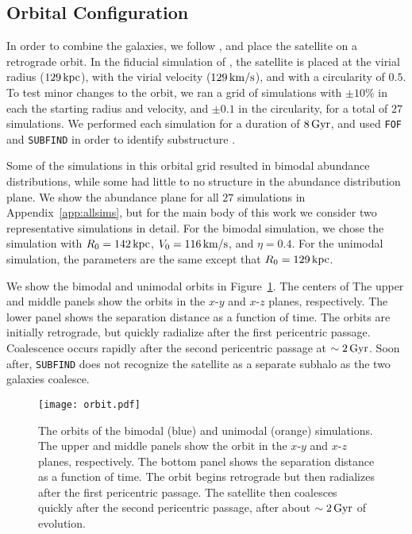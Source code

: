 \subsection{Orbital Configuration}\label{ssec:orbit_setup}
In order to combine the galaxies, we follow \citet{2021ApJ...923...92N}, and place the satellite on a retrograde orbit. In the fiducial simulation of \citet{2021ApJ...923...92N}, the satellite is placed at the virial radius ($129\,\textrm{kpc}$), with the virial velocity ($129\,\textrm{km}/\textrm{s}$), and with a circularity of $0.5$. To test minor changes to the orbit, we ran a grid of simulations with $\pm10\%$ in each the starting radius and velocity, and $\pm0.1$ in the circularity, for a total of $27$ simulations. We performed each simulation for a duration of $8\,\textrm{Gyr}$, and used \texttt{FOF} and \texttt{SUBFIND} in order to identify substructure \citep{2005Natur.435..629S,2009MNRAS.399..497D}.

Some of the simulations in this orbital grid resulted in bimodal abundance distributions, while some had little to no structure in the abundance distribution plane. We show the abundance plane for all $27$ simulations in Appendix~\ref{app:allsims}, but for the main body of this work we consider two representative simulations in detail. For the bimodal simulation, we chose the simulation with $R_0=142\,\textrm{kpc}$, $V_0=116\,\textrm{km}/\textrm{s}$, and $\eta=0.4$. For the unimodal simulation, the parameters are the same except that $R_0=129\,\textrm{kpc}$.

We show the bimodal and unimodal orbits in Figure~\ref{fig:orbit}. The centers of  The upper and middle panels show the orbits in the $x$-$y$ and $x$-$z$ planes, respectively. The lower panel shows the separation distance as a function of time. The orbits are initially retrograde, but quickly radialize after the first pericentric passage. Coalescence occurs rapidly after the second pericentric passage at $\sim2\,\textrm{Gyr}$. Soon after, \texttt{SUBFIND} does not recognize the satellite as a separate subhalo as the two galaxies coalesce.

\begin{figure}
    \centering
    \texttt{[image: orbit.pdf]}
    \caption{The orbits of the bimodal (blue) and unimodal (orange) simulations. The upper and middle panels show the orbit in the $x$-$y$ and $x$-$z$ planes, respectively. The bottom panel shows the separation distance as a function of time. The orbit begins retrograde but then radializes after the first pericentric passage. The satellite then coalesces quickly after the second pericentric passage, after about $\sim2\,\textrm{Gyr}$ of evolution.}
    \label{fig:orbit}
\end{figure}

